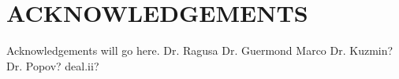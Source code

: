 \chapter*{ACKNOWLEDGEMENTS}

\indent Acknowledgements will go here.
Dr. Ragusa
Dr. Guermond
Marco
Dr. Kuzmin?
Dr. Popov?
deal.ii?

\pagebreak{}
